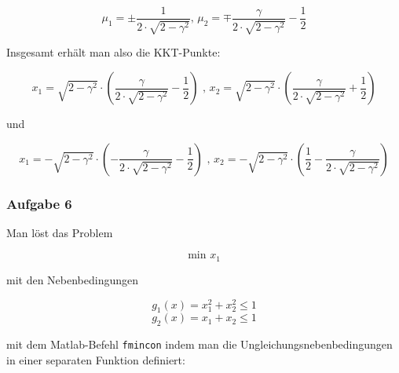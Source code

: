 \documentclass[a4paper, 12pt]{report}
\begin{document}
$$\mu_1 = \pm \frac{1}{2\cdot \sqrt{2 - \gamma^2}} \text{, } \mu_2 = \mp \frac{\gamma}{2\cdot \sqrt{2 - \gamma^2}} - \frac{1}{2}$$

Insgesamt erhält man also die KKT-Punkte:

$$x_1 = \sqrt{2 - \gamma^2} \cdot \left( \frac{\gamma}{2\cdot\sqrt{2 - \gamma^2}} - \frac{1}{2} \right) \text{ , } x_2 = \sqrt{2 - \gamma^2} \cdot \left( \frac{\gamma}{2\cdot\sqrt{2 - \gamma^2}} + \frac{1}{2} \right)$$

und

$$x_1 = -\sqrt{2 - \gamma^2}\cdot \left(-\frac{\gamma}{2\cdot \sqrt{2 - \gamma^2}} - \frac{1}{2}\right) \text{ , } x_2 = -\sqrt{2 - \gamma^2} \cdot \left( \frac{1}{2} - \frac{\gamma}{2\cdot\sqrt{2 - \gamma^2}} \right)$$

\subsubsection{Aufgabe 6}

Man löst das Problem

$$\text{min } x_1$$

mit den Nebenbedingungen

$$g_1(x) = x_1^2 + x_2^2 \leq 1$$
$$g_2(x) = x_1 + x_2 \leq 1$$

mit dem Matlab-Befehl \lstinline[basicstyle=\ttfamily\color{black}]|fmincon| indem man die Ungleichungsnebenbedingungen in einer separaten Funktion
definiert:

\end{document}

